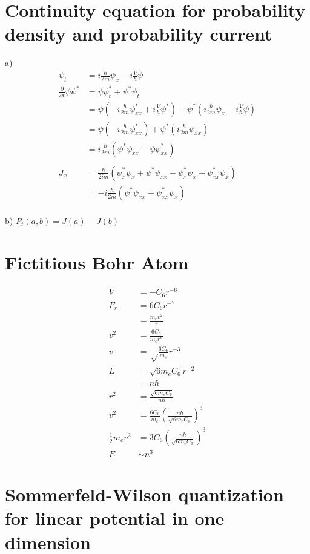 \documentclass{article}
\title{}
\date{}
\newcommand{\half}{\frac{1}{2}}
\newcommand{\<}{\langle}
\renewcommand{\>}{\rangle}
\begin{document}
\maketitle

\section{Continuity equation for probability density and probability current}
a)
\begin{align*}
\psi_t &= i\frac{\hbar}{2m} \psi_x -i\frac{V}{\hbar} \psi \\
\frac{\partial}{\partial t} \psi\psi^* &= \psi\psi^*_t + \psi^*\psi_t \\
&= \psi(-i\frac{\hbar}{2m} \psi^*_{xx} + i\frac{V}{\hbar} \psi^* ) + \psi^*(i\frac{\hbar}{2m} \psi_x -i\frac{V}{\hbar} \psi) \\
&= \psi(-i\frac{\hbar}{2m} \psi^*_{xx}) + \psi^*(i\frac{\hbar}{2m} \psi_{xx}) \\ 
&= i\frac{\hbar}{2m} (\psi^*\psi_{xx} - \psi\psi^*_{xx}) \\
\\
J_x &= \frac{\hbar}{2im}(\psi^*_x\psi_x + \psi^*\psi_{xx} - \psi^*_x\psi_x - \psi^*_{xx}\psi_x) \\
&= -i\frac{\hbar}{2m}(\psi^*\psi_{xx} - \psi^*_{xx}\psi_x) 
\end{align*}
\\
b) $P_t(a,b) = J(a) - J(b)$

\section{Fictitious Bohr Atom}

\begin{align*}
V &= -C_6r^{-6} \\
F_r &= 6C_6r^{-7} \\
&= \frac{m_e v^2}{r} \\
v^2 &= \frac{6C_6}{m_er^6} \\
v &= \sqrt\frac{6C_6}{m_e}r^{-3} \\
L &= \sqrt{6m_eC_6}r^{-2} \\
&= n\hbar \\
r^2 &= \frac{\sqrt{6m_eC_6}}{n\hbar} \\
v^2 &= \frac{6C_6}{m_e} (\frac{n\hbar}{\sqrt{6m_eC_6}})^3 \\
\half m_e v^2 &= 3C_6 (\frac{n\hbar}{\sqrt{6m_eC_6}})^3 \\
E &\sim n^3
\end{align*}

\section{Sommerfeld-Wilson quantization for linear potential in one dimension}
\end{document}
